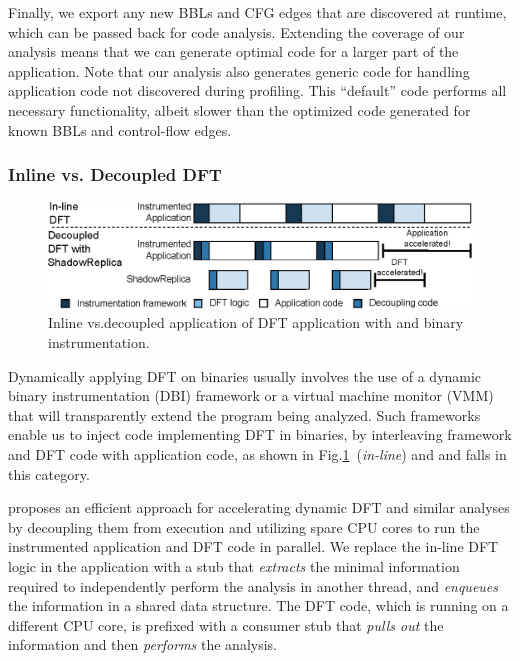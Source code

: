 Finally, we export any new BBLs and CFG edges that are discovered at runtime,
which can be passed back for code analysis. Extending the coverage of our
analysis means that we can generate optimal code for a larger part of the
application. Note that our analysis also generates generic code for handling
application code not discovered during profiling. This “default” code performs
all necessary functionality, albeit slower than the optimized code generated
for known BBLs and control-flow edges.

\subsubsection{Inline vs. Decoupled DFT}
\label{sec:inlinevsdecoupled}

\begin{figure}[tb]
    \centering
    \includegraphics[width=0.65\linewidth]{figs/decoupling.eps}
    \caption{Inline vs.decoupled application of DFT application with \sreplica
    and binary instrumentation.\label{fig:decoupling}}
\end{figure}

Dynamically applying DFT on binaries usually involves the use of a dynamic
binary instrumentation (DBI) framework or a virtual machine monitor (VMM) that
will transparently extend the program being analyzed. Such frameworks enable us
to inject code implementing DFT in binaries, by interleaving framework and DFT
code with application code, as shown in
Fig.\ref{fig:decoupling}~(\textit{in-line}) and \libdft and \tfa falls in this
category.

\sreplica proposes an efficient approach for accelerating dynamic DFT and similar
analyses by decoupling them from execution and utilizing spare CPU cores to run
the instrumented application and DFT code in parallel. We replace the in-line
DFT logic in the application with a stub that \emph{extracts} the minimal
information required to independently perform the analysis in another thread,
and \emph{enqueues} the information in a shared data structure. The DFT code,
which is running on a different CPU core, is prefixed with a consumer stub that
\emph{pulls out} the information and then \emph{performs} the analysis.

